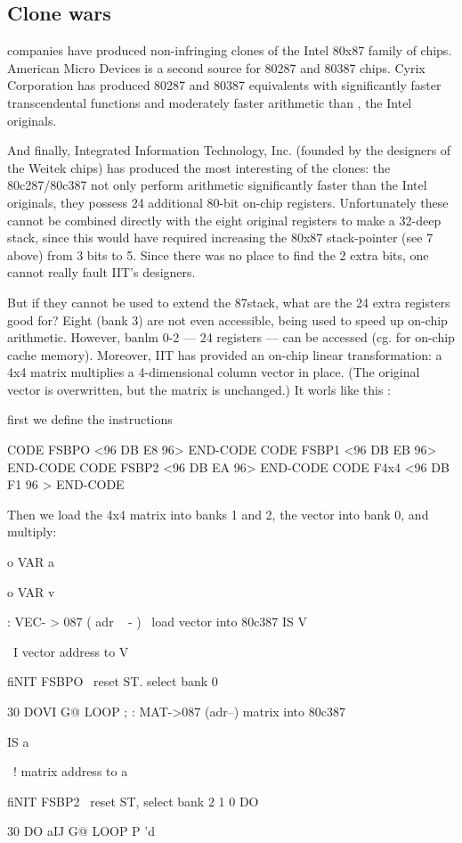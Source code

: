 {{{{{\begin{itemize}
\section{Clone wars}

 companies have produced non-infringing clones of the Intel 80x87 family of chips. American Micro Devices is a second source for 80287 and 80387 chips. Cyrix Corporation has produced 80287 and 80387 equivalents with significantly faster transcendental functions and moderately faster arithmetic than , the Intel originals.

And finally, Integrated Information Technology, Inc. (founded by the designers of the Weitek chips) has produced the most interesting of the clones: the 80c287/80c387 not only perform arithmetic significantly faster than the Intel originals, they possess 24 additional 80-bit on-chip registers. Unfortunately these cannot be combined directly with the eight original registers to make a 32-deep stack, since this would have required increasing the 80x87 stack-pointer (see 7 above) from 3 bits to 5. Since there was no place to find the 2 extra bits, one cannot really fault IIT's designers.

But if they cannot be used to extend the 87stack, what are the 24
extra registers good for? Eight (bank 3) are not even accessible,
being used to speed up on-chip arithmetic. However, banlm 0-2
— 24 registers — can be accessed (cg. for on-chip cache memory).
Moreover, IIT has provided an on-chip linear transformation: a
4x4 matrix multiplies a 4-dimensional column vector in place. (The
original vector is overwritten, but the matrix is unchanged.) It worls
like this :

first we define the instructions

CODE FSBPO <96 DB E8 96> END-CODE
CODE FSBP1 <96 DB EB 96> END-CODE
CODE FSBP2 <96 DB EA 96> END-CODE
CODE F4x4 <96 DB F1 96 > END-CODE

Then we load the 4x4 matrix into banks 1 and 2, the vector into
bank 0, and multiply:

o VAR a{{ o VAR v{

: VEC- > 087 ( adr ~ - ) \ load vector into 80c387
IS V{ \ I vector address to V{
fiNIT FSBPO \ reset ST. select bank 0

30 DOV{I} G@ LOOP ;
: MAT->087 (adr--) \Ioad matrix into 80c387

IS a{{ \ ! matrix address to a{{
fiNIT FSBP2 \ reset ST, select bank 2
1 0 DO

30 DO a{{IJ}} G@ LOOP
P \cont'd

}}}}}}}}}
\end{itemize}}}}}}
